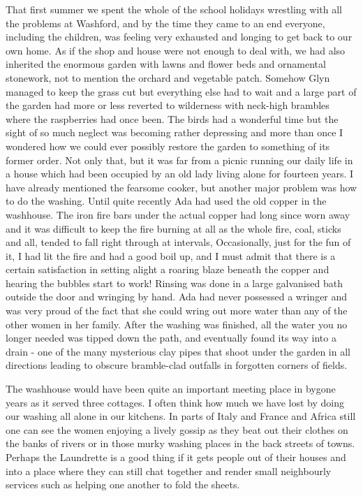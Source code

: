 
That first summer we spent the whole of the school holidays wrestling with all the problems at Washford, and by the time they came to an end everyone, including the children, was feeling very exhausted and longing to get back to our own home. As if the shop and house were not enough to deal with, we had also inherited the enormous garden with lawns and flower beds and ornamental stonework, not to mention the orchard and vegetable patch. Somehow Glyn managed to keep the grass cut but everything else had to wait and a large part of the garden had more or less reverted to wilderness with neck-high brambles where the raspberries had once been. The birds had a wonderful time but the sight of so much neglect was becoming rather depressing and more than once I wondered how we could ever possibly restore the garden to something of its former order. Not only that, but it was far from a picnic running our daily life in a house which had been occupied by an old lady living alone for fourteen years. I have already mentioned the fearsome cooker, but another major problem was how to do the washing. Until quite recently Ada had used the old copper in the washhouse. The iron fire bars under the actual copper had long since worn away and it was difficult to keep the fire burning at all as the whole fire, coal, sticks and all, tended to fall right through at intervals, Occasionally, just for the fun of it, I had lit the fire and had a good boil up, and I must admit that there is a certain satisfaction in setting alight a roaring blaze beneath the copper and hearing the bubbles start to work! Rinsing was done in a large galvanised bath outside the door and wringing by hand. Ada had never possessed a wringer and was very proud of the fact that she could wring out more water than any of the other women in her family. After the washing was finished, all the water you no longer needed was tipped down the path, and eventually found its way into a drain - one of the many mysterious clay pipes that shoot under the garden in all directions leading to obscure bramble-clad outfalls in forgotten corners of fields.

The washhouse would have been quite an important meeting place in bygone years as it served three cottages. I often think how much we have lost by doing our washing all alone in our kitchens. In parts of Italy and France and Africa still one can see the women enjoying a lively gossip as they beat out their clothes on the banks of rivers or in those murky washing places in the back streets of towns. Perhaps the Laundrette is a good thing if it gets people out of their houses and into a place where they can still chat together and render small neighbourly services such as helping one another to fold the sheets.

